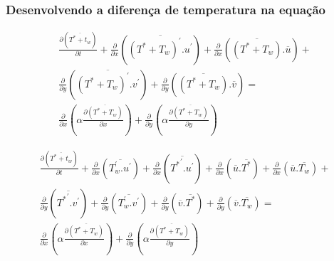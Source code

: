 \documentclass[xcolor=dvipsnames,10pt,aspectratio=169]{beamer}
\begin{document}
		
		\begin{frame}
		\frametitle{Desenvolvendo a diferença de temperatura na equação}
		\begin{equation}
		\begin{split}
		\frac{\partial ( \overline{T^\ast + t_w}  ) }{\partial t} +
		\frac{\partial{}}{\partial{x}} \left(\overline{(T^\ast + T_w)^\prime . u^\prime}\right) + \frac{\partial{}}{\partial{x}}\left(\overline{(T^\ast + T_w)}. \overline{u}\right)+  \\
		\frac{\partial{}}{\partial{y}} \left(\overline{(T^\ast + T_w)^\prime . v^\prime}\right) + \frac{\partial{}}{\partial{y}}\left(\overline{(T^\ast + T_w)} . \overline{v}\right) = \\
		{\frac{\partial{}}{\partial{x}}} \left(\alpha {\frac{\partial{\overline{(T^\ast + T_w)}}}{\partial{x}}} \right) +
		{\frac{\partial{}}{\partial{y}}} \left(\alpha {\frac{\partial{\overline{(T^\ast + T_w)}}}{\partial{y}}} \right) 
		\end{split}
		\end{equation}
		\begin{center}\begin{equation}\begin{split}
		\frac{\partial ( \overline{ T^\ast + t_w } ) }{\partial t} +
		\frac{\partial{}}{\partial{x}} \left(\overline{T_w^{\prime} . u^{\prime}}\right) +\frac{\partial{}}{\partial{x}} \left(\overline{{T^{\ast}}^{\prime} . u^{\prime}}\right)
		+\frac{\partial{}}{\partial{x}}\left(\overline{u}. \overline{T^{\ast}}\right)+ 
		\frac{\partial{}}{\partial{x}}\left(\overline{u}. \overline{T_w}\right)+ 
		\\
		\frac{\partial{}}{\partial{y}} \left(\overline{{T^{\ast}}^{\prime} .v^{\prime}}\right)+
		\frac{\partial{}}{\partial{y}} \left(\overline{T_w^\prime . v^\prime}\right) + \frac{\partial{}}{\partial{y}}\left(\overline{v}. \overline{T^\ast}\right) +
		\frac{\partial{}}{\partial{y}}\left(\overline{v}. \overline{T_w}\right) 
		= 
		\\
		{\frac{\partial{}}{\partial{x}}} \left(\alpha {\frac{\partial{\overline{(T^\ast + T_w)}}}{\partial{x}}} \right) +
		{\frac{\partial{}}{\partial{y}}} \left(\alpha {\frac{\partial{\overline{(T^\ast + T_w)}}}{\partial{y}}} \right) 
		\end{split}\end{equation}\end{center}
		\end{frame}
		
		
		
		
		
\end{document}
